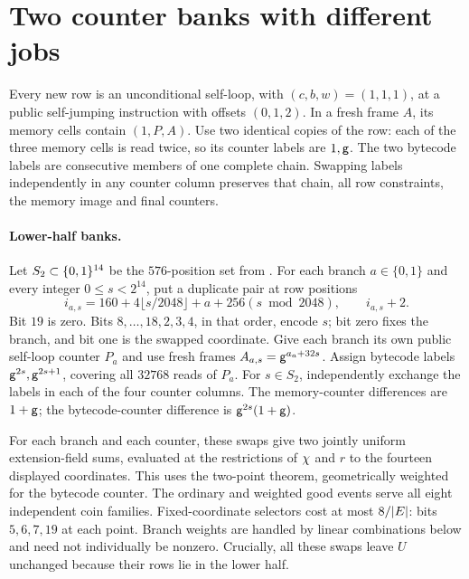 \documentclass[11pt]{article}
\begin{document}
\section{Two counter banks with different jobs}

Every new row is an unconditional self-loop, with $(c,b,w)=(1,1,1)$, at a public self-jumping instruction with offsets $(0,1,2)$. In a fresh frame $A$, its memory cells contain $(1,P,A)$. Use two identical copies of the row: each of the three memory cells is read twice, so its counter labels are $1,\mathsf{g}$. The two bytecode labels are consecutive members of one complete chain. Swapping labels independently in any counter column preserves that chain, all row constraints, the memory image and final counters.

\paragraph{Lower-half banks.} Let $S_2\subset\{0,1\}^{14}$ be the $576$-position set from . For each branch $a\in\{0,1\}$ and every integer $0\le s<2^{14}$, put a duplicate pair at row positions
\[
 i_{a,s}=160+4\lfloor s/2048\rfloor+a+256(s\bmod2048),
 \qquad i_{a,s}+2.
\]
Bit $19$ is zero. Bits $8,\ldots,18,2,3,4$, in that order, encode $s$; bit zero fixes the branch, and bit one is the swapped coordinate. Give each branch its own public self-loop counter $P_a$ and use fresh frames $A_{a,s}=\mathsf{g}^{a_a+32s}$. Assign bytecode labels $\mathsf{g}^{2s},\mathsf{g}^{2s+1}$, covering all $32768$ reads of $P_a$. For $s\in S_2$, independently exchange the labels in each of the four counter columns. The memory-counter differences are $1+\mathsf{g}$; the bytecode-counter difference is $\mathsf{g}^{2s}(1+\mathsf{g})$.

For each branch and each counter, these swaps give two jointly uniform extension-field sums, evaluated at the restrictions of $\chi$ and $r$ to the fourteen displayed coordinates. This uses the two-point theorem, geometrically weighted for the bytecode counter. The ordinary and weighted good events serve all eight independent coin families. Fixed-coordinate selectors cost at most $8/|E|$: bits $5,6,7,19$ at each point. Branch weights are handled by linear combinations below and need not individually be nonzero. Crucially, all these swaps leave $U$ unchanged because their rows lie in the lower half.
\end{document}
